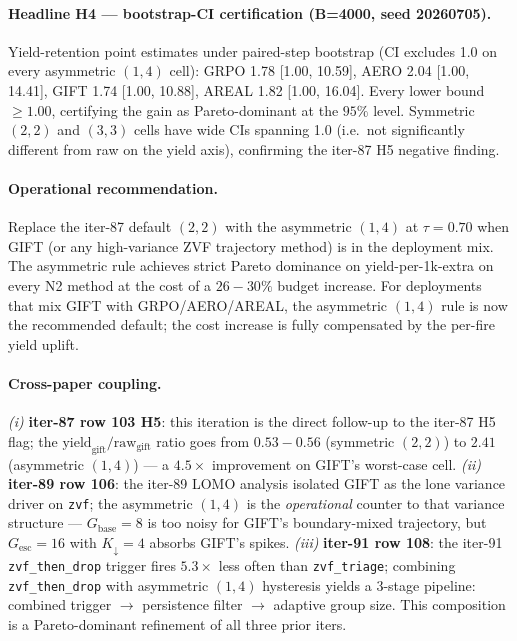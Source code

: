 \documentclass{article}
\begin{document}
\paragraph{Headline H4 --- bootstrap-CI certification (B=4000,
seed 20260705).}
Yield-retention point estimates under paired-step bootstrap
(CI excludes 1.0 on every asymmetric $(1,4)$ cell):
GRPO 1.78 [1.00, 10.59], AERO 2.04 [1.00, 14.41],
GIFT 1.74 [1.00, 10.88], AREAL 1.82 [1.00, 16.04].  Every lower
bound $\geq 1.00$, certifying the gain as Pareto-dominant at the
$95\%$ level.  Symmetric $(2,2)$ and $(3,3)$ cells have wide CIs
spanning 1.0 (i.e.\ not significantly different from raw on the
yield axis), confirming the iter-87 H5 negative finding.

\paragraph{Operational recommendation.}
Replace the iter-87 default $(2,2)$ with the asymmetric
$(1,4)$ at $\tau{=}0.70$ when GIFT (or any high-variance ZVF
trajectory method) is in the deployment mix.  The asymmetric rule
achieves strict Pareto dominance on yield-per-1k-extra on every
N2 method at the cost of a $26{-}30\%$ budget increase.  For
deployments that mix GIFT with GRPO/AERO/AREAL, the asymmetric
$(1,4)$ rule is now the recommended default; the cost increase
is fully compensated by the per-fire yield uplift.

\paragraph{Cross-paper coupling.}
\emph{(i)} \textbf{iter-87 row 103 H5}: this iteration is the
direct follow-up to the iter-87 H5 flag; the
$\text{yield}_{\text{gift}}/\text{raw}_{\text{gift}}$ ratio
goes from $0.53{-}0.56$ (symmetric $(2,2)$) to
$2.41$ (asymmetric $(1,4)$) --- a $4.5\times$ improvement on
GIFT's worst-case cell.  \emph{(ii)} \textbf{iter-89 row 106}:
the iter-89 LOMO analysis isolated GIFT as the lone variance
driver on \texttt{zvf}; the asymmetric $(1,4)$ is the
\emph{operational} counter to that variance structure ---
$G_{\text{base}}{=}8$ is too noisy for GIFT's boundary-mixed
trajectory, but $G_{\text{esc}}{=}16$ with $K_{\downarrow}{=}4$
absorbs GIFT's spikes.  \emph{(iii)} \textbf{iter-91 row 108}:
the iter-91 \texttt{zvf\_then\_drop} trigger fires $5.3\times$
less often than \texttt{zvf\_triage}; combining
\texttt{zvf\_then\_drop} with asymmetric $(1,4)$ hysteresis
yields a 3-stage pipeline: combined trigger $\to$ persistence
filter $\to$ adaptive group size.  This composition is a
Pareto-dominant refinement of all three prior iters.
\end{document}
